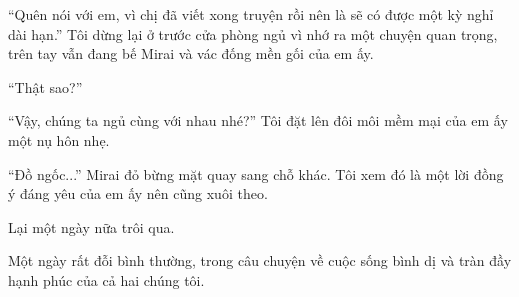 {``Quên nói với em, vì chị đã viết xong truyện rồi nên là sẽ có được một
kỳ nghỉ dài hạn.'' Tôi dừng lại ở trước cửa phòng ngủ vì nhớ ra một
chuyện quan trọng, trên tay vẫn đang bế Mirai và vác đống mền gối của em
ấy.

``Thật sao?''

``Vậy, chúng ta ngủ cùng với nhau nhé?'' Tôi đặt lên đôi môi mềm mại của
em ấy một nụ hôn nhẹ.

``Đồ ngốc...'' Mirai đỏ bừng mặt quay sang chỗ khác. Tôi xem đó là một
lời đồng ý đáng yêu của em ấy nên cũng xuôi theo.

Lại một ngày nữa trôi qua.

Một ngày rất đỗi bình thường, trong câu chuyện về cuộc sống bình dị và
tràn đầy hạnh phúc của cả hai chúng tôi.

}